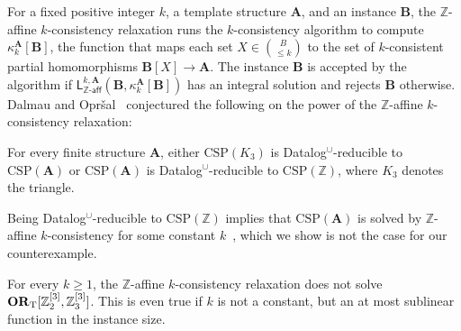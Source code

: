 \documentclass[a4paper,english, thm-restate]{lipics-v2021}
\newcommand{\ZZ}{\mathbb{Z}}
\newcommand{\StructA}{\mathbf{A}}
\newcommand{\StructB}{\mathbf{B}}
\newcommand{\CSP}[1]{\mathrm{CSP}(#1)}
\newcommand{\kcol}[3]{\kappa_{#1}^{#2}[#3]}
\newcommand{\leqs}{\mathsf{L}}
\newcommand{\zafkleq}[4]{\leqs^{#1,#2}_{\ZZ\mathsf{\text{-}aff}}(#3,#4)}
\begin{document}
	\noindent 
	For a fixed positive integer $k$, a template structure $\StructA$,
	and an instance $\StructB$,
	the $\ZZ$-affine $k$-consistency relaxation runs the $k$-consistency algorithm
	to compute $\kcol{k}{\StructA}{\StructB}$,
	the function that maps each set $X \in \binom{B}{\leq k}$ to the set of $k$-consistent partial homomorphisms $\StructB[X] \to \StructA$.
	The instance $\StructB$ is accepted by the algorithm
	if $\zafkleq{k}{\StructA}{\StructB}{\kcol{k}{\StructA}{\StructB}}$ has an integral solution and rejects $\StructB$ otherwise.
	Dalmau and Opr\v{s}al~\cite{DalmauOprsal2024} conjectured the following
	on the power of the $\ZZ$-affine $k$-consistency relaxation:
	\begin{conjecture}[restate=sthreeorZ, name = \cite{DalmauOprsal2024}]
		\label{con:s3-or-Z}
		For every finite structure $\StructA$,
		either
		$\CSP{K_3}$ is Datalog$^\cup$-reducible to $\CSP{\StructA}$
		or
		$\CSP{\StructA}$ is Datalog$^\cup$-reducible to $\CSP{\ZZ}$,
		where $K_3$ denotes the triangle.
	\end{conjecture}
	\noindent Being Datalog$^\cup$-reducible to $\CSP{\ZZ}$ implies
	that $\CSP{\StructA}$ is solved by $\ZZ$-affine $k$\nobreakdash-consistency for some constant $k$~\cite{DalmauOprsal2024}, which we show is not the case for our counterexample.
	
	
	
	
	\begin{theorem}[restate=zAffineDoesNotSolveBoundedColorClass, name =]
		\label{thm:z-affine-does-not-solve-bounded-color-class}
		For every $k\geq 1$, the $\ZZ$-affine $k$-consistency relaxation does not solve $\ZtwoOrThreeInst$.
		This is even true if $k$ is not a constant, but an at most sublinear function in the instance size.
	\end{theorem}
	
\end{document}
